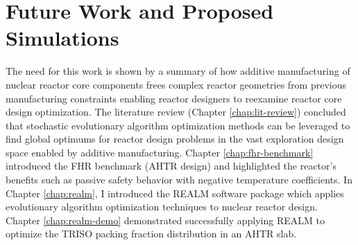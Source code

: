 \chapter{Future Work and Proposed Simulations}




The need for this work is shown by a summary of how additive manufacturing 
of nuclear reactor core components frees complex reactor geometries from 
previous manufacturing constraints enabling reactor designers to reexamine 
reactor core design optimization.
The literature review (Chapter \ref{chap:lit-review}) concluded that stochastic 
evolutionary algorithm optimization methods can be leveraged to find global 
optimums for reactor design problems in the vast exploration design space 
enabled by additive manufacturing. 
Chapter \ref{chap:fhr-benchmark} introduced the \acrfull{FHR} benchmark 
(\gls{AHTR} design) and highlighted the reactor's benefits such as passive safety 
behavior with negative temperature coefficients. 
In Chapter \ref{chap:realm}, I introduced the \acrfull{REALM} software package 
which applies evolutionary algorithm optimization techniques to nuclear 
reactor design. 
Chapter \ref{chap:realm-demo} demonstrated successfully applying \gls{REALM} 
to optimize the \gls{TRISO} packing fraction distribution in an \gls{AHTR} slab. 

